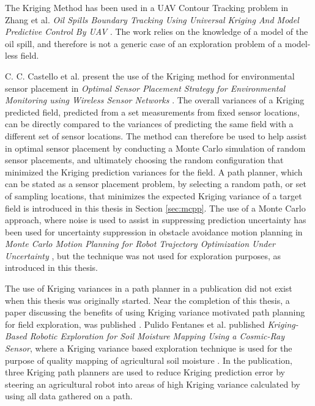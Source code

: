 The Kriging Method has been used in a UAV Contour Tracking problem in Zhang et al. \textit{Oil Spills Boundary Tracking Using Universal Kriging And Model Predictive Control By UAV} \cite{zhang:oil_krig}. The work relies on the knowledge of a model of the oil spill, and therefore is not a generic case of an exploration problem of a model-less field.

C. C. Castello et al. present the use of the Kriging method for environmental sensor placement in \textit{Optimal Sensor Placement Strategy for Environmental Monitoring using Wireless Sensor Networks} \cite{kriging:sensorplacement}. The overall variances of a Kriging predicted field, predicted from a set measurements from fixed sensor locations, can be directly compared to the variances of predicting the same field with a different set of sensor locations. The method can therefore be used to help assist in optimal sensor placement by conducting a Monte Carlo simulation of random sensor placements, and ultimately choosing the random configuration that minimized the Kriging prediction variances for the field. A path planner, which can be stated as a sensor placement problem, by selecting a random path, or set of sampling locations, that minimizes the expected Kriging variance of a target field is introduced in this thesis in Section \ref{sec:mcpp}. The use of a Monte Carlo approach, where noise is used to assist in suppressing prediction uncertainty has been used for uncertainty suppression in obstacle avoidance motion planning in \textit{Monte Carlo Motion Planning for Robot Trajectory Optimization Under Uncertainty} \cite{janson:mcmp}, but the technique was not used for exploration purposes, as introduced in this thesis.

The use of Kriging variances in a path planner in a publication did not exist when this thesis was originally started. Near the completion of this thesis, a paper discussing the benefits of using Kriging variance motivated path planning for field exploration, was published \cite{fentanes:soilkrig}. Pulido Fentanes et al. published \textit{Kriging-Based Robotic Exploration for Soil Moisture Mapping Using a Cosmic-Ray Sensor}, where a Kriging variance based exploration technique is used for the purpose of quality mapping of agricultural soil moisture \cite{fentanes:soilkrig}. In the publication, three Kriging path planners are used to reduce Kriging prediction error by steering an agricultural robot into areas of high Kriging variance calculated by using all data gathered on a path. 

